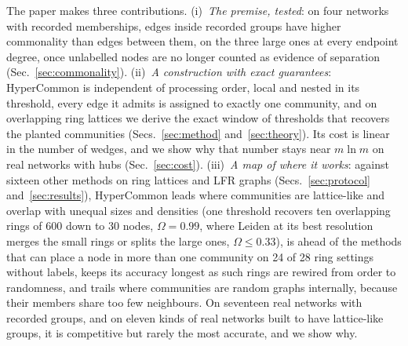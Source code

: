 The paper makes three contributions. (i)~\emph{The premise, tested}: on four networks
with recorded memberships, edges inside recorded groups have higher commonality than
edges between them, on the three large ones at every endpoint degree, once unlabelled nodes are no longer
counted as evidence of separation (Sec.~\ref{sec:commonality}). (ii)~\emph{A
construction with exact guarantees}: HyperCommon is independent of processing order,
local and nested in its threshold, every edge it admits is assigned to exactly one
community, and on overlapping ring lattices we derive the exact window of thresholds
that recovers the planted communities (Secs.~\ref{sec:method} and~\ref{sec:theory}).
Its cost is linear in the number of wedges, and we show why that number stays near
$m\ln m$ on real networks with hubs (Sec.~\ref{sec:cost}). (iii)~\emph{A map of where it
works}: against sixteen other methods on ring lattices and LFR graphs
(Secs.~\ref{sec:protocol} and~\ref{sec:results}), HyperCommon leads where communities
are lattice-like and overlap with unequal sizes and densities (one threshold recovers ten overlapping rings of 600 down to 30 nodes, $\Omega=0.99$, where Leiden at its best resolution merges the small rings or splits the large ones, $\Omega\le0.33$), is ahead of the methods that can place a node in more than one community on 24 of 28 ring settings without labels, keeps its accuracy longest as such rings are rewired from order to randomness, and trails where
communities are random graphs internally, because their members share too few
neighbours. On seventeen real networks with recorded groups, and on eleven kinds of real
networks built to have lattice-like groups, it is competitive but rarely the most
accurate, and we show why.
